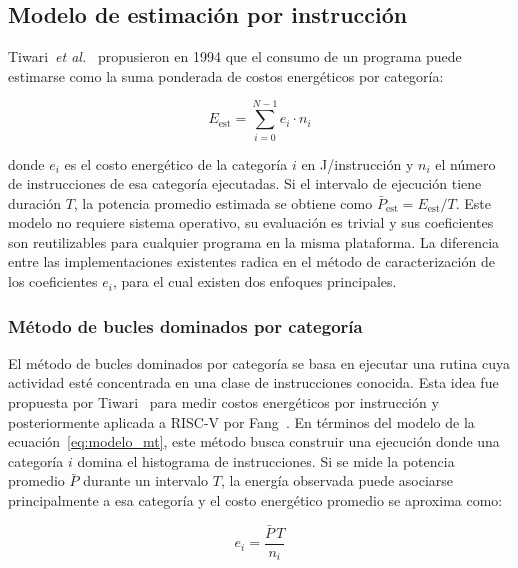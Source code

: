 \subsection{Modelo de estimación por instrucción}
\label{sec:modelo}

Tiwari~\emph{et al.}~\cite{tiwari1994power} propusieron en 1994 que el consumo
de un programa puede estimarse como la suma ponderada de costos energéticos por
categoría:

\begin{equation}
    E_{\text{est}} = \sum_{i=0}^{N-1} e_i \cdot n_i
    \label{eq:modelo_mt}
\end{equation}

donde $e_i$ es el costo energético de la categoría $i$ en J/instrucción y $n_i$
el número de instrucciones de esa categoría ejecutadas. Si el intervalo de
ejecución tiene duración $T$, la potencia promedio estimada se obtiene como
$\bar{P}_{\text{est}} = E_{\text{est}}/T$. Este modelo no requiere sistema operativo,
su evaluación es trivial y sus coeficientes son reutilizables para cualquier
programa en la misma plataforma. La diferencia entre las implementaciones
existentes radica en el método de caracterización de los coeficientes $e_i$, para
el cual existen dos enfoques principales.

\subsubsection*{Método de bucles dominados por categoría}

El método de bucles dominados por categoría se basa en ejecutar una rutina cuya
actividad esté concentrada en una clase de instrucciones conocida. Esta idea fue
propuesta por Tiwari~\cite{tiwari1994power} para medir costos energéticos por
instrucción y posteriormente aplicada a RISC-V por Fang~\cite{fang2021instruction}.
En términos del modelo de la ecuación~\ref{eq:modelo_mt}, este método busca
construir una ejecución donde una categoría $i$ domina el histograma de
instrucciones. Si se mide la potencia promedio $\bar{P}$ durante un intervalo
$T$, la energía observada puede asociarse principalmente a esa categoría y el
costo energético promedio se aproxima como:

\begin{equation}
    e_i = \frac{\bar{P}\,T}{n_i}
    \label{eq:bucles_homogeneos}
\end{equation}

